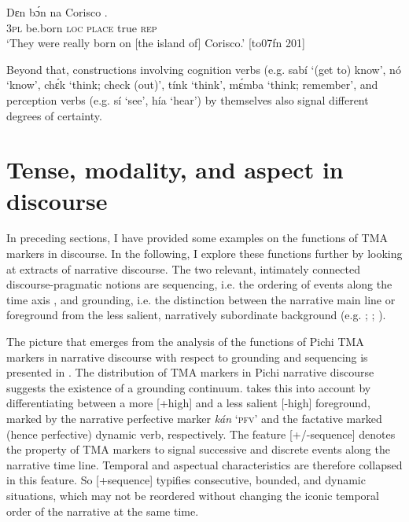 \ea%
    \label{ex:key:455}
    \gll Dɛn  bɔ́n    na  Corisco   .\\
\textsc{3pl}  be.born  \textsc{loc}  \textsc{place}  true  \textsc{rep}\\

\glt ‘They were really born on [the island of] Corisco.’ [to07fn 201]
\z

Beyond that, constructions involving cognition verbs (e.g. sabí ‘(get to) know’, nó ‘know’, chɛ́k ‘think; check (out)’, tínk ‘think’, mɛ́mba ‘think; remember’, and perception verbs (e.g. sí ‘see’, hía ‘hear’) by themselves also signal different degrees of certainty.{\fff} 

\section{Tense, modality, and aspect in discourse}\label{sec:6.8}

In preceding sections, I have provided some examples on the functions of TMA markers in discourse. In the following, I explore these functions further by looking at extracts of narrative discourse. The two relevant, intimately connected discourse-pragmatic notions are sequencing, i.e. the ordering of events along the time axis \citep{Hopper1982}, and grounding, i.e. the distinction between the narrative main line or foreground from the less salient, narratively subordinate background (e.g. \citealt{HopperThompson1980}; \citealt{Longacre1996}; \citealt{YoussefJames1999}).


The picture that emerges from the analysis of the functions of Pichi TMA markers in narrative discourse with respect to grounding and sequencing is presented in . The distribution of TMA markers in Pichi narrative discourse suggests the existence of a grounding continuum.  takes this into account by differentiating between a more [+high] and a less salient [-high] foreground, marked by the narrative perfective marker \textit{kán} ‘\textsc{pfv}’ and the factative marked (hence perfective) dynamic verb, respectively. The feature [+/-sequence] denotes the property of TMA markers to signal successive and discrete events along the narrative time line. Temporal and aspectual characteristics are therefore collapsed in this feature. So [+sequence] typifies consecutive, bounded, and dynamic situations, which may not be reordered without changing the iconic temporal order of the narrative at the same time. 



